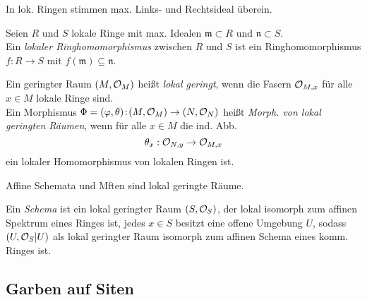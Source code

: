 \documentclass{cheat-sheet}
\begin{document}
\begin{bem}
  In lok. Ringen stimmen max. Links- und Rechtsideal überein.
\end{bem}

\begin{defn}
  Seien $R$ und $S$ lokale Ringe mit max. Idealen $\mathfrak{m} \!\subset\! R$ und $\mathfrak{n} \!\subset\! S$. \\
  Ein \emph{lokaler Ringhomomorphismus} zwischen $R$ und $S$ ist ein Ringhomomorphismus $f : R \to S$ mit $f(\mathfrak{m}) \subseteq \mathfrak{n}$.
\end{defn}

\begin{defn}
  Ein geringter Raum $(M, \mathcal{O}_M)$ heißt \emph{lokal geringt}, wenn die Fasern $\mathcal{O}_{M,x}$ für alle $x \in M$ lokale Ringe sind. \\
  Ein Morphismus $\Phi = (\varphi, \theta) \!:\! (M, \mathcal{O}_M) \to (N, \mathcal{O}_N)$ heißt \emph{Morph. von lokal geringten Räumen}, wenn für alle $x \in M$ die ind. Abb.
  \[ \theta_x : \mathcal{O}_{N,y} \to \mathcal{O}_{M,x} \]
  ein lokaler Homomorphismus von lokalen Ringen ist.
\end{defn}

\begin{bspe}
  Affine Schemata und Mften sind lokal geringte Räume.
\end{bspe}


\begin{defn}
  Ein \emph{Schema} ist ein lokal geringter Raum $(S, \mathcal{O}_S)$, der lokal isomorph zum affinen Spektrum eines Ringes ist, \dh{} jedes $x \in S$ besitzt eine offene Umgebung $U$, sodass $(U, \mathcal{O}_S|U)$ als lokal geringter Raum isomorph zum affinen Schema eines komm. Ringes ist.
\end{defn}




\begin{samepage}

\subsection{Garben auf Siten}

\end{samepage}
\end{document}
